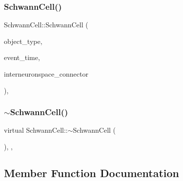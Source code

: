 \mbox{\label{classSchwannCell_abaa1caff5e245ede16a538d1e1bcc1e7}} 
\subsubsection{\texorpdfstring{Schwann\+Cell()}{SchwannCell()}\hspace{0.1cm}{\footnotesize\ttfamily [4/4]}}
{\footnotesize\ttfamily Schwann\+Cell\+::\+Schwann\+Cell (\begin{DoxyParamCaption}\item[{unsigned int}]{object\+\_\+type,  }\item[{std\+::chrono\+::time\+\_\+point$<$ \mbox{\hyperlink{universe_8h_a0ef8d951d1ca5ab3cfaf7ab4c7a6fd80}{Clock}} $>$}]{event\+\_\+time,  }\item[{\mbox{\hyperlink{classInterneuronSpace}{Interneuron\+Space}} \&}]{interneuronspace\+\_\+connector }\end{DoxyParamCaption})\hspace{0.3cm}{\ttfamily [inline]}, {\ttfamily [private]}}

\mbox{\label{classSchwannCell_af98a51e1f9c191bb57282dbbb16dd2a9}} 
\subsubsection{\texorpdfstring{$\sim$\+Schwann\+Cell()}{~SchwannCell()}}
{\footnotesize\ttfamily virtual Schwann\+Cell\+::$\sim$\+Schwann\+Cell (\begin{DoxyParamCaption}{ }\end{DoxyParamCaption})\hspace{0.3cm}{\ttfamily [inline]}, {\ttfamily [private]}, {\ttfamily [virtual]}}



\subsection{Member Function Documentation}
\mbox{\label{classSchwannCell_ab43faeb8f76529162985b2a0c53eb3f5}} 
